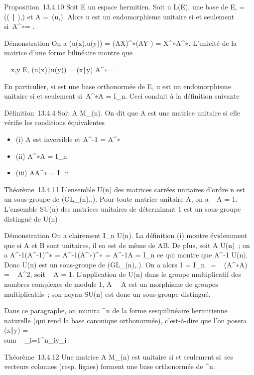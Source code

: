 \documentclass[]{article}
\begin{document}
Proposition~13.4.10 Soit E un espace hermitien. Soit u \in L(E),  une
base de E, \Omega = \mathrmMat~
(( ∣ ),) et A =\
\mathrmMat (u,). Alors u est un endomorphisme
unitaire si et seulement si~A^∗\OmegaA = \Omega.

Démonstration On a \phi(u(x),u(y)) = (AX)^∗\Omega(AY ) =
X^∗A^∗\OmegaAY . L'unicité de la matrice d'une forme
bilinéaire montre que

\forall~~x,y \in E,
(u(x)∣u(y)) =
(x∣y) \mathrel\Leftrightarrow
A^∗\OmegaA = \Omega

En particulier, si  est une base orthonormée de E, u est un
endomorphisme unitaire si et seulement si~A^∗A =
I_n. Ceci conduit à la définition suivante

Définition~13.4.4 Soit A \in M_(n). On dit que A est une matrice
unitaire si elle vérifie les conditions équivalentes

\begin{itemize}
\itemsep1pt\parskip0pt
\item
  (i) A est inversible et A^-1 = A^∗
\item
  (ii) A^∗A = I_n
\item
  (iii) AA^∗ = I_n
\end{itemize}

Théorème~13.4.11 L'ensemble U(n) des matrices carrées unitaires d'ordre
n est un sous-groupe de (GL_\mathbb{C}(n),.). Pour toute matrice
unitaire A, on a
~
A = 1. L'ensemble SU(n) des matrices unitaires de déterminant
1 est un sous-groupe distingué de U(n) .

Démonstration On a clairement I_n \in U(n). La définition (i)
montre évidemment que si A et B sont unitaires, il en est de même de AB.
De plus, soit A \in U(n)~; on a
A^-1(A^-1)^∗ =
A^-1(A^∗)^∗ = A^-1A =
I_n ce qui montre que A^-1 \in U(n). Donc U(n) est un
sous-groupe de (GL_(n),.). On a alors 1
=  I_n~
= ~
(A^∗A) =
~
A^2, soit
\mathrm{det}~
A = 1. L'application de U(n) dans le groupe multiplicatif des
nombres complexes de module 1,
A\mapsto~~
A est un morphisme de groupes multiplicatifs~; son noyau SU(n) est donc
un sous-groupe distingué.

Dans ce paragraphe, on munira ^n de la forme sesquilinéaire
hermitienne naturelle (qui rend la base canonique orthonormée),
c'est-à-dire que l'on posera (x∣y)
= \\sum ~
_i=1^n\overlinex_iy_i

Théorème~13.4.12 Une matrice A \in M_(n) est unitaire si et
seulement si~ses vecteurs colonnes (resp. lignes) forment une base
orthonormée de \mathbb{C}^n.
\end{document}
